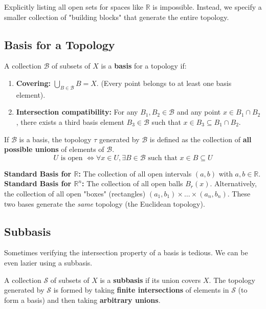 Explicitly listing all open sets for spaces like $\mathbb{R}$ is impossible. Instead, we specify a smaller collection of "building blocks" that generate the entire topology.

\subsection{Basis for a Topology}

\begin{definition}[Basis]
A collection $\mathcal{B}$ of subsets of $X$ is a \textbf{basis} for a topology if:
\begin{enumerate}
    \item \textbf{Covering:} $\bigcup_{B \in \mathcal{B}} B = X$. (Every point belongs to at least one basis element).
    \item \textbf{Intersection compatibility:} For any $B_1, B_2 \in \mathcal{B}$ and any point $x \in B_1 \cap B_2$, there exists a third basis element $B_3 \in \mathcal{B}$ such that $x \in B_3 \subseteq B_1 \cap B_2$.
\end{enumerate}
\end{definition}

If $\mathcal{B}$ is a basis, the topology $\tau$ generated by $\mathcal{B}$ is defined as the collection of \textbf{all possible unions} of elements of $\mathcal{B}$.
\[ U \text{ is open } \iff \forall x \in U, \exists B \in \mathcal{B} \text{ such that } x \in B \subseteq U \]

\textbf{Standard Basis for $\mathbb{R}$:} The collection of all open intervals $(a, b)$ with $a, b \in \mathbb{R}$.
\textbf{Standard Basis for $\mathbb{R}^n$:} The collection of all open balls $B_r(x)$. Alternatively, the collection of all open "boxes" (rectangles) $(a_1, b_1) \times \dots \times (a_n, b_n)$. These two bases generate the \textit{same} topology (the Euclidean topology).

\subsection{Subbasis}

Sometimes verifying the intersection property of a basis is tedious. We can be even lazier using a subbasis.
\begin{definition}[Subbasis]
A collection $\mathcal{S}$ of subsets of $X$ is a \textbf{subbasis} if its union covers $X$. The topology generated by $\mathcal{S}$ is formed by taking \textbf{finite intersections} of elements in $\mathcal{S}$ (to form a basis) and then taking \textbf{arbitrary unions}.
\end{definition}

